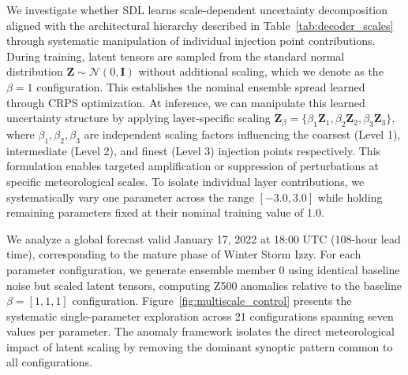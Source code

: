 \documentclass{agujournal2019}
\begin{document}
We investigate whether SDL learns scale-dependent uncertainty decomposition aligned with the architectural hierarchy described in Table~\ref{tab:decoder_scales} through systematic manipulation of individual injection point contributions. During training, latent tensors are sampled from the standard normal distribution $\mathbf{Z} \sim \mathcal{N}(0, \mathbf{I})$ without additional scaling, which we denote as the $\beta = 1$ configuration. This establishes the nominal ensemble spread learned through CRPS optimization. At inference, we can manipulate this learned uncertainty structure by applying layer-specific scaling $\mathbf{Z}_\beta = \{\beta_1\mathbf{Z}_1, \beta_2\mathbf{Z}_2, \beta_3\mathbf{Z}_3\}$, where $\beta_1, \beta_2, \beta_3$ are independent scaling factors influencing the coarsest (Level 1), intermediate (Level 2), and finest (Level 3) injection points respectively. This formulation enables targeted amplification or suppression of perturbations at specific meteorological scales. To isolate individual layer contributions, we systematically vary one parameter across the range $[-3.0, 3.0]$ while holding remaining parameters fixed at their nominal training value of 1.0.


We analyze a global forecast valid January 17, 2022 at 18:00 UTC (108-hour lead time), corresponding to the mature phase of Winter Storm Izzy. For each parameter configuration, we generate ensemble member 0 using identical baseline noise but scaled latent tensors, computing Z500 anomalies relative to the baseline $\beta=[1,1,1]$ configuration. Figure~\ref{fig:multiscale_control} presents the systematic single-parameter exploration across 21 configurations spanning seven values per parameter. The anomaly framework isolates the direct meteorological impact of latent scaling by removing the dominant synoptic pattern common to all configurations.
\end{document}
